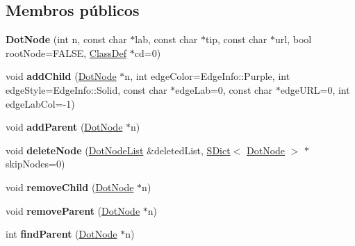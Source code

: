 \subsection*{Membros públicos}
\begin{DoxyCompactItemize}
\item 
\hypertarget{class_dot_node_ac6d52a1b11a78dbd86d35cd74c61ddee}{{\bfseries Dot\-Node} (int n, const char $\ast$lab, const char $\ast$tip, const char $\ast$url, bool root\-Node=F\-A\-L\-S\-E, \hyperlink{class_class_def}{Class\-Def} $\ast$cd=0)}\label{class_dot_node_ac6d52a1b11a78dbd86d35cd74c61ddee}

\item 
\hypertarget{class_dot_node_a446f1a7f04df73887525e7a77f57c727}{void {\bfseries add\-Child} (\hyperlink{class_dot_node}{Dot\-Node} $\ast$n, int edge\-Color=Edge\-Info\-::\-Purple, int edge\-Style=Edge\-Info\-::\-Solid, const char $\ast$edge\-Lab=0, const char $\ast$edge\-U\-R\-L=0, int edge\-Lab\-Col=-\/1)}\label{class_dot_node_a446f1a7f04df73887525e7a77f57c727}

\item 
\hypertarget{class_dot_node_a2a5f24a87fc3b33e75a3ec58a2ba60b6}{void {\bfseries add\-Parent} (\hyperlink{class_dot_node}{Dot\-Node} $\ast$n)}\label{class_dot_node_a2a5f24a87fc3b33e75a3ec58a2ba60b6}

\item 
\hypertarget{class_dot_node_a69cff802868fc101e276a219d8faec80}{void {\bfseries delete\-Node} (\hyperlink{class_dot_node_list}{Dot\-Node\-List} \&deleted\-List, \hyperlink{class_s_dict}{S\-Dict}$<$ \hyperlink{class_dot_node}{Dot\-Node} $>$ $\ast$skip\-Nodes=0)}\label{class_dot_node_a69cff802868fc101e276a219d8faec80}

\item 
\hypertarget{class_dot_node_a8aa6709d7a54cbfa9fe9d17cf1408063}{void {\bfseries remove\-Child} (\hyperlink{class_dot_node}{Dot\-Node} $\ast$n)}\label{class_dot_node_a8aa6709d7a54cbfa9fe9d17cf1408063}

\item 
\hypertarget{class_dot_node_af7660478bb09d2c6c39ed66adf30f853}{void {\bfseries remove\-Parent} (\hyperlink{class_dot_node}{Dot\-Node} $\ast$n)}\label{class_dot_node_af7660478bb09d2c6c39ed66adf30f853}

\item 
\hypertarget{class_dot_node_a32f2819561b47966a1a4b77208b2c91d}{int {\bfseries find\-Parent} (\hyperlink{class_dot_node}{Dot\-Node} $\ast$n)}\label{class_dot_node_a32f2819561b47966a1a4b77208b2c91d}


\end{DoxyCompactItemize}

